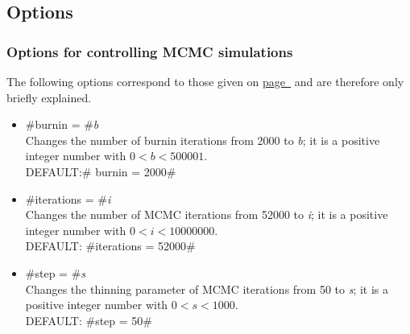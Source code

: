 \subsection{Options}

\subsubsection*{Options for controlling MCMC simulations}

The following options correspond to those given on
\hyperref[mcmc_options]{page~\pageref*{mcmc_options}} and are
therefore only briefly explained.
\begin{itemize}
\item #burnin = #{\em b} \\
Changes the number of burnin iterations from 2000 to {\em b}; it is a positive integer number with $0<b<500001$.\\
DEFAULT:# burnin = 2000#
\item #iterations = #{\em i} \\
Changes the number of MCMC iterations from 52000 to {\em i}; it is a positive integer number with $0< i<10000000$.\\
DEFAULT: #iterations = 52000#
\item #step = #{\em s} \\
Changes the thinning parameter of MCMC iterations from 50 to {\em s}; it is a positive integer number with $0<s<1000$.\\
DEFAULT: #step = 50#
\end{itemize}

